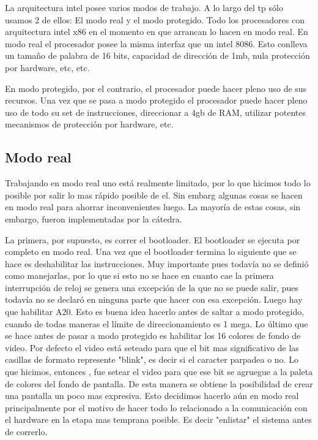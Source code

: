 	La arquitectura intel posee varios modos de trabajo. A lo largo
del tp sólo usamos 2 de ellos: El modo real y el modo protegido. Todo
los procesadores con arquitectura intel x86 en el momento en que arrancan lo
hacen en modo real. En modo real el procesador posee la misma interfaz
que un intel 8086. Esto conlleva un tamaño de palabra de 16 bits,
capacidad de dirección de 1mb, nula protección por hardware, etc, etc.

	En modo protegido, por el contrario, el procesador puede hacer pleno
uso de sus recursos. Una vez que se pasa a modo protegido el procesador
puede hacer pleno uso de todo su set de instrucciones, direccionar a 4gb de RAM,
utilizar potentes mecanismos de protección por hardware, etc.

\subsection{Modo real}

	Trabajando en modo real uno está realmente limitado, por lo que
hicimos todo lo posible por salir lo mas rápido posible de el. Sin embarg
algunas cosas se hacen en modo real para ahorrar inconvenientes luego. La
mayoría de estas cosas, sin embargo, fueron implementadas por la cátedra.

	La primera, por supuesto, es correr el bootloader. El bootloader se
ejecuta por completo en modo real. Una vez que el bootloader termina lo siguiente
que se hace es deshabilitar las instrucciones. Muy importante pues todavía
no se definió como manejarlas, por lo que si esto no se hace
en cuanto cae la primera interrupción de reloj se genera una excepción de
la que no se puede salir, pues todavía no se declaró en ninguna parte
que hacer con esa excepción. Luego hay que habilitar A20. Esto 
es buena idea hacerlo antes de saltar a modo protegido, cuando de todas
maneras el límite de direccionamiento es 1 mega. Lo último que se hace antes de pasar
a modo protegido es habilitar los 16 colores de fondo de video. Por defecto
el video está seteado para que el bit mas significativo de las casillas de formato
represente "blink", es decir si el caracter parpadea o no. Lo que hicimos, entonces
, fue setear el video para que ese bit se agruegue a la paleta de colores del fondo
de pantalla. De esta manera se obtiene la posibilidad de crear una pantalla
un poco mas expresiva. Esto decidimos hacerlo aún en modo real principalmente
por el motivo de hacer todo lo relacionado a la comunicación con el hardware
en la etapa mas temprana posible. Es decir "enlistar" el sistema antes de
correrlo.

